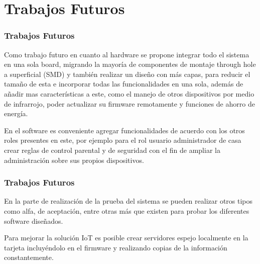 \section{Trabajos Futuros}
\begin{frame}[t]
\frametitle{Trabajos Futuros}

Como trabajo futuro en cuanto al hardware se propone integrar todo el sistema en una sola board, migrando la mayoría de componentes de montaje through hole a superficial (SMD) y también realizar un diseño con más capas, para reducir el tamaño de esta e incorporar todas las funcionalidades en una sola, además de añadir mas características a este, como el manejo de otros dispositivos por medio de infrarrojo, poder actualizar su firmware remotamente y funciones de ahorro de energía.\newline

En el software es conveniente agregar funcionalidades de acuerdo con los otros roles presentes en este, por ejemplo para el rol usuario administrador de casa crear reglas de control parental y de seguridad con el fin de ampliar la administración sobre sus propios dispositivos.\\

\end{frame}

\begin{frame}[t]
\frametitle{Trabajos Futuros}

En la parte de realización de la prueba del sistema se pueden realizar otros tipos como alfa, de aceptación, entre otras más que existen para probar los diferentes software diseñados.\newline

Para mejorar la solución IoT es posible crear servidores espejo localmente en la tarjeta incluyéndolo en el firmware y realizando copias de la información constantemente.\\
\end{frame}